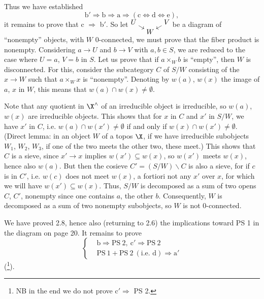 Thus we have established
\[
\mathrm{b}'\Longrightarrow\mathrm{b}\Longrightarrow\mathrm{a}\Longrightarrow(\mathrm{c}\Longleftrightarrow\mathrm{d}\Longleftrightarrow\mathrm{e}),
\]
it remains to prove that c $\Longrightarrow$ b$'$. So let $\begin{tikzcd}[cramped, row sep=0.1em, column sep=0.8em, baseline=(current bounding box.center)] U \arrow[dr] & & V \arrow[dl] \\ & W & \end{tikzcd}$ be a diagram of ``nonempty'' objects, with $W$ 0-connected, we must prove that the fiber product is nonempty. Considering $a\longrightarrow U$ and $b\longrightarrow V$ with $a,b\in S$, we are reduced to the case where $U=a$, $V=b$ in $S$. Let us prove that if $a\times_W b$ is ``empty'', then $W$ is disconnected. For this, consider the subcategory $C$ of $S/W$ consisting of the $x\longrightarrow W$ such that $a\times_W x$ is ``nonempty''. Denoting by $w(a)$, $w(x)$ the image of $a$, $x$ in $W$, this means that $w(a)\cap w(x)\neq\emptyset$.

Note that any quotient in $\X^\wedge$ of an irreducible object is irreducible, so $w(a)$, $w(x)$ are irreducible objects. This shows that for $x$ in $C$ and $x'$ in $S/W$, we have $x'$ in $C$, i.e. $w(a)\cap w(x')\neq\emptyset$ if and only if $w(x)\cap w(x')\neq\emptyset$. (Direct lemma: in an object $W$ of a topos $\X$, if we have irreducible subobjects $W_1$, $W_2$, $W_3$, if one of the two meets the other two, these meet.) This shows that $C$ is a sieve, since $x'\longrightarrow x$ implies $w(x')\subseteq w(x)$, so $w(x')$ meets $w(x)$, hence also $w(a)$. But then the cosieve $C'=(S/W)\backslash C$ is also a sieve, for if $c$
is in $C'$, i.e. $w(c)$ does not meet $w(x)$, a fortiori not any $x'$ over $x$, for which we will have $w(x')\subseteq w(x)$. Thus, $S/W$ is decomposed as a sum of two opens $C$, $C'$, nonempty since one contains $a$, the other $b$. Consequently, $W$ is decomposed as a sum of two nonempty subobjects, so $W$ is not 0-connected.

We have proved 2.8, hence also (returning to 2.6) the implications toward PS 1 in the diagram on page 20. It remains to prove
\[
\left\{
\begin{aligned}
&\mathrm{b}\Longrightarrow\mathrm{PS}\ 2,\ \mathrm{c}'\Longrightarrow\mathrm{PS}\ 2\\
&\mathrm{PS}\ 1+\mathrm{PS}\ 2\ (\text{i.e. d})\Longrightarrow\mathrm{a}'
\end{aligned}
\right.
\]
(\footnote[32]{NB in the end we do not prove c$'\Longrightarrow$ PS 2.}).


